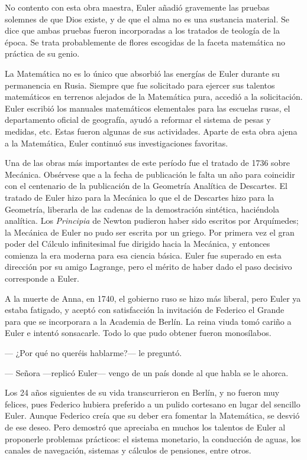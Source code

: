 \documentclass[a4paper, 12pt]{article}
\begin{document}
No contento con esta obra maestra, Euler añadió gravemente las pruebas solemnes de que Dios existe, y de que el alma no es una sustancia material. Se dice que ambas pruebas fueron incorporadas a los tratados de teología de la época. Se trata probablemente de flores escogidas de la faceta matemática no práctica de su genio.

La Matemática no es lo único que absorbió las energías de Euler durante su permanencia en Rusia. Siempre que fue solicitado para ejercer sus talentos matemáticos en terrenos alejados de la Matemática pura, accedió a la solicitación. Euler escribió los manuales matemáticos elementales para las escuelas rusas, el departamento oficial de geografía, ayudó a reformar el sistema de pesas y medidas, etc. Estas fueron algunas de sus actividades. Aparte de esta obra ajena a la Matemática, Euler continuó sus investigaciones favoritas.

Una de las obras más importantes de este período fue el tratado de 1736 sobre Mecánica. Obsérvese que a la fecha de publicación le falta un año para coincidir con el centenario de la publicación de la Geometría Analítica de Descartes. El tratado de Euler hizo para la Mecánica lo que el de Descartes hizo para la Geometría, liberarla de las cadenas de la demostración sintética, haciéndola analítica. Los {\it Principia} de Newton pudieron haber sido escritos por Arquímedes; la Mecánica de Euler no pudo ser escrita por un griego. Por primera vez el gran poder del Cálculo infinitesimal fue dirigido hacia la Mecánica, y entonces comienza la era moderna para esa ciencia básica. Euler fue superado en esta dirección por su amigo Lagrange, pero el mérito de haber dado el paso decisivo corresponde a Euler.

A la muerte de Anna, en 1740, el gobierno ruso se hizo más liberal, pero Euler ya estaba fatigado, y aceptó con satisfacción la invitación de Federico el Grande para que se incorporara a la Academia de Berlín. La reina viuda tomó cariño a Euler e intentó sonsacarle. Todo lo que pudo obtener fueron monosílabos.

--- ¿Por qué no queréis hablarme?--- le preguntó.

--- Señora ---replicó Euler--- vengo de un país donde al que habla se le ahorca.

Los 24 años siguientes de su vida transcurrieron en Berlín, y no fueron muy felices, pues Federico hubiera preferido a un pulido cortesano en lugar del sencillo Euler. Aunque Federico creía que su deber era fomentar la Matemática, se desvió de ese deseo. Pero demostró que apreciaba en muchos los talentos de Euler al proponerle problemas prácticos: el sistema monetario, la conducción de aguas, los canales de navegación, sistemas y cálculos de pensiones, entre otros.
\end{document}
